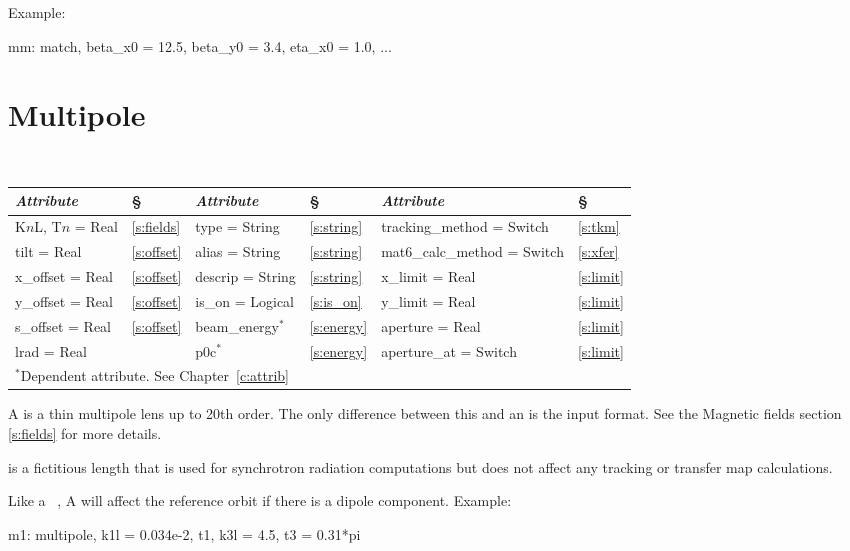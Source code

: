 {{Example:
\begin{example}
  mm: match, beta_x0 = 12.5, beta_y0 = 3.4, eta_x0 = 1.0, ...
\end{example}

\section{Multipole}
\label{s:mult}

\begin{center}
\tt
\begin{tabular}{|l|l||l|l||l|l|} \hline
  {\sl Attribute} & \S  & {\sl Attribute} & \S & {\sl Attribute} & \S \\ \hline
  K$n$L, T$n$ = Real &  \ref{s:fields} &  type = String       & \ref{s:string} & tracking\_method = Switch   & \ref{s:tkm}   \\ \hline
  tilt       = Real  &  \ref{s:offset} &  alias = String      & \ref{s:string} & mat6\_calc\_method = Switch & \ref{s:xfer}  \\ \hline
  x\_offset  = Real  &  \ref{s:offset} &  descrip = String    & \ref{s:string} & x\_limit = Real             & \ref{s:limit} \\ \hline
  y\_offset  = Real  &  \ref{s:offset} &  is\_on = Logical    & \ref{s:is_on}  & y\_limit = Real             & \ref{s:limit} \\ \hline
  s\_offset  = Real  &  \ref{s:offset} &  beam\_energy$^*$    & \ref{s:energy} & aperture = Real             & \ref{s:limit} \\ \hline
  lrad       = Real  &                 &  p0c$^*$             & \ref{s:energy} & aperture\_at = Switch       & \ref{s:limit} \\ \hline
  \multicolumn{6}{l}{\small $^*$Dependent attribute. See Chapter~\ref{c:attrib}} \\
\end{tabular}
\end{center}
\toffset

A  is a thin multipole lens up to 20th order. The only
difference between this and an  is the input format. See the 
Magnetic fields section \ref{s:fields} for more details.

 is a fictitious length that is used for synchrotron radiation
computations but does not affect any tracking or transfer map calculations. 

Like a \mad\ , A \bmad {} will affect the
reference orbit if there is a dipole component. 
Example:
\begin{example}
  m1: multipole, k1l = 0.034e-2, t1, k3l = 4.5, t3 = 0.31*pi
\end{example}

}}
